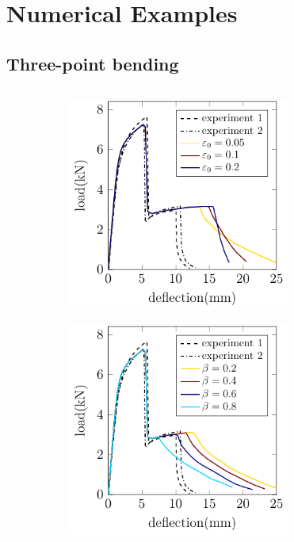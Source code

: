 \section{Numerical Examples}

\sectioncover

\subsection{Three-point bending}

\begin{frame}
  \begin{columns}[T]
    \begin{column}{0.6\textwidth}
      \vspace{-1em}
      \begin{figure}
        \centering
        \begin{subfigure}{0.32\linewidth}
          \centering
          \includegraphics[width=0.8\textwidth]{examples/figures/Chapter5-3pb-load_deflection-constant_beta}
        \end{subfigure}
        \begin{subfigure}{0.32\linewidth}
          \centering
          \includegraphics[width=0.8\textwidth]{examples/figures/Chapter5-3pb-load_deflection-constant_e0}

\end{subfigure}
\end{figure}
\end{column}
\end{columns}
\end{frame}
